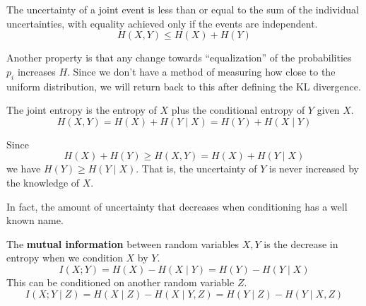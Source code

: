 \documentclass{article}
\begin{document}
    \begin{theorem}
      The uncertainty of a joint event is less than or equal to the sum of the individual uncertainties, with equality achieved only if the events are independent. 
      \begin{equation}
        H(X, Y) \leq H(X) + H(Y)
      \end{equation}
    \end{theorem}

    Another property is that any change towards ``equalization'' of the probabilities $p_i$ increases $H$. Since we don't have a method of measuring how close to the uniform distribution, we will return back to this after defining the KL divergence.  

    \begin{theorem}
      The joint entropy is the entropy of $X$ plus the conditional entropy of $Y$ given $X$. 
      \begin{equation}
        H(X, Y) = H(X) + H(Y \mid X) = H(Y) + H(X \mid Y)
      \end{equation}
    \end{theorem}

    \begin{theorem}
      Since 
      \begin{equation}
        H(X) + H(Y) \geq H(X, Y) = H(X) + H(Y \mid X)
      \end{equation}
      we have $H(Y) \geq H(Y \mid X)$. That is, the uncertainty of $Y$ is never increased by the knowledge of $X$. 
    \end{theorem}

    In fact, the amount of uncertainty that decreases when conditioning has a well known name. 

    \begin{definition}
      The \textbf{mutual information} between random variables $X, Y$ is the decrease in entropy when we condition $X$ by $Y$. 
      \begin{equation}
        I(X ; Y) = H(X) - H(X \mid Y) = H(Y) - H(Y \mid X)
      \end{equation}
      This can be conditioned on another random variable $Z$. 
      \begin{equation}
        I(X ; Y \mid Z) = H(X \mid Z) - H(X \mid Y, Z) = H(Y \mid Z) - H(Y \mid X, Z)
      \end{equation}
    \end{definition}
\end{document}
